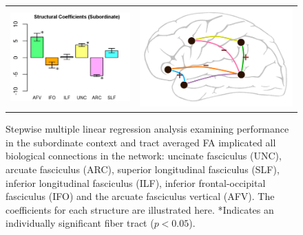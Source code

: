 \begin{figure}[h]
\begin{center}
\begin{tabular}{c c}
\includegraphics[width=0.45\linewidth]{figures/FA_Subordinate2.png} &
\includegraphics[width=0.45\linewidth]{figures/struct_diag2.png}
\end{tabular}
\caption{Stepwise multiple linear regression analysis examining performance in the subordinate context and tract averaged FA implicated all biological connections in the network: uncinate fasciculus (UNC), arcuate fasciculus (ARC), superior longitudinal fasciculus (SLF), inferior longitudinal fasciculus (ILF), inferior frontal-occipital fasciculus (IFO) and the arcuate fasciculus vertical (AFV). The coefficients for each structure are illustrated here. *Indicates an individually significant fiber tract ($p<0.05$).}
\label{fig:mlr_fa}
\end{center}
\end{figure}



